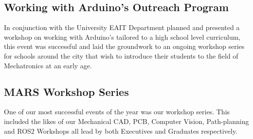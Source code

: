 \documentclass[a4paper,12pt]{report}
\begin{document}
\vspace{-1.8cm}

\subsection{Working with Arduino's Outreach Program}
In conjunction with the University EAIT Department planned and presented a workshop on working with Arduino's tailored to a high school level curriculum, this event was successful and laid the groundwork to an ongoing workshop series for schools around the city that wish to introduce their students to the field of Mechatronics at an early age.

\vspace{-1.8cm}

\subsection{MARS Workshop Series}
One of our most successful events of the year was our workshop series. This included the likes of our Mechanical CAD, PCB, Computer Vision, Path-planning and ROS2 Workshops all lead by both Executives and Graduates respectively.

\vspace{-1.5cm}
\end{document}
